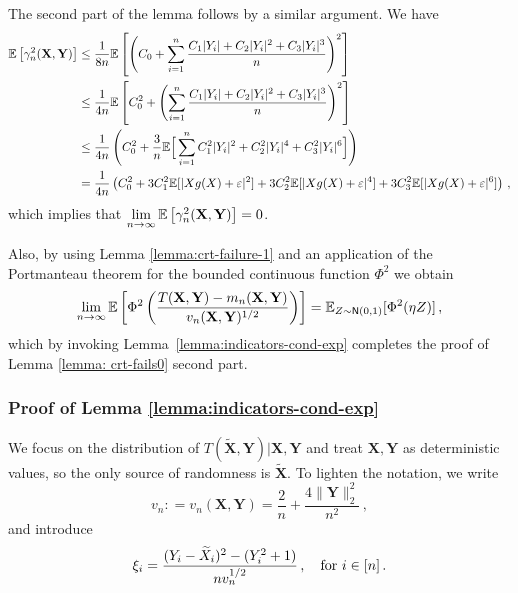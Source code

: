 \documentclass[11pt]{article}
\def\bX{\mathbf{X}}
\def\bY{\mathbf{Y}}
\def\normal{\mathsf{N}}
\def\tbX{\widetilde{\bX}}
\begin{document}
The second part of the lemma follows by a similar argument.
We have 
\begin{align*}
\E\left[\gamma_n^2(\bX,\bY)\right] 
& \leq \frac{1}{8n} \E\left[ \left( C_0+\sum\limits_{i=1}^{n}\frac{C_1|Y_i|+C_2|Y_i|^2+C_3|Y_i|^3}{n} \right)^2 \right] \\
& \leq \frac{1}{4n} \E\left[  C_0^2+ \left(\sum\limits_{i=1}^{n}\frac{C_1|Y_i|+C_2|Y_i|^2+C_3|Y_i|^3}{n} \right)^2 \right] \\
& \leq \frac{1}{4n} \left(C_0^2+ \frac{3}{n} \E\Big[\sum_{i=1}^n C_1^2|Y_i|^2+C_2^2|Y_i|^4+C_3^2|Y_i|^6 \Big] \right) \\
&= \frac{1}{4n} \left( C_0^2+ 3C_1^2\E[|Xg(X)+\eps|^2] +3C_2^2\E[|Xg(X)+\eps|^4]+3C_3^2\E[|Xg(X)+\eps|^6] \right) \,,
\end{align*}
 which implies that $ \lim\limits_{n\rightarrow \infty}^{} \E\left[\gamma_n^2(\bX,\bY)\right] =0$.
 
Also, by using Lemma \ref{lemma:crt-failure-1} and an application of the Portmanteau theorem for the bounded continuous function $\Phi^2$ we obtain
\[
\lim\limits_{n\rightarrow \infty}^{}  \E \left[ \Phi^2\left(    \frac{T(\bX,\bY)- m_n(\bX,\bY)}{ v_n(\bX,\bY)^{1/2} }   \right) \right]=\E_{Z\sim \normal(0,1)}[\Phi^2(\eta Z)]\,,
\]
which by invoking Lemma~\ref{lemma:indicators-cond-exp} completes the proof of Lemma \ref{lemma: crt-fails0} second part.








\subsubsection{Proof of Lemma \ref{lemma:indicators-cond-exp}}
We focus on the distribution of $T(\tbX,\bY)|\bX,\bY$ and treat $\bX,\bY$ as deterministic values, so the only source of randomness is $\tbX$.  To lighten the notation, we write 
\[
v_n: = v_n(\bX,\bY) = \frac{2}{n} + \frac{4\|\bY\|_2^2}{n^2}\,,
\]
and introduce  
\[
\xi_i=\frac{(Y_i-{\widetilde{X}}_i)^2-(Y_i^2+1)}{n v_n^{1/2}}\,,\quad\text{for } i\in [n]\,.
\]
\end{document}
